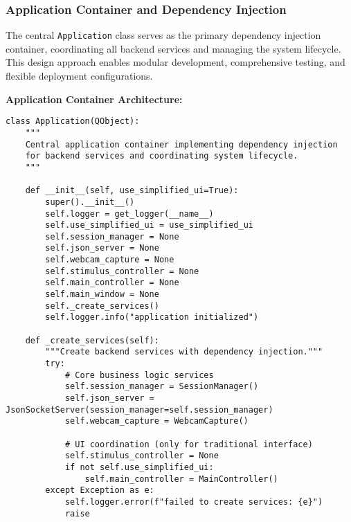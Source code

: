 \documentclass[11pt,a4paper]{article}
\begin{document}
\subsubsection{Application Container and Dependency Injection}

The central \texttt{Application} class serves as the primary dependency injection container, coordinating all backend services
and managing the system lifecycle. This design approach enables modular development, comprehensive testing, and flexible
deployment configurations.

\textbf{Application Container Architecture:}

\begin{verbatim}
class Application(QObject):
    """
    Central application container implementing dependency injection
    for backend services and coordinating system lifecycle.
    """

    def __init__(self, use_simplified_ui=True):
        super().__init__()
        self.logger = get_logger(__name__)
        self.use_simplified_ui = use_simplified_ui
        self.session_manager = None
        self.json_server = None
        self.webcam_capture = None
        self.stimulus_controller = None
        self.main_controller = None
        self.main_window = None
        self._create_services()
        self.logger.info("application initialized")

    def _create_services(self):
        """Create backend services with dependency injection."""
        try:
            # Core business logic services
            self.session_manager = SessionManager()
            self.json_server = JsonSocketServer(session_manager=self.session_manager)
            self.webcam_capture = WebcamCapture()

            # UI coordination (only for traditional interface)
            self.stimulus_controller = None
            if not self.use_simplified_ui:
                self.main_controller = MainController()
        except Exception as e:
            self.logger.error(f"failed to create services: {e}")
            raise


\end{verbatim}
\end{document}
